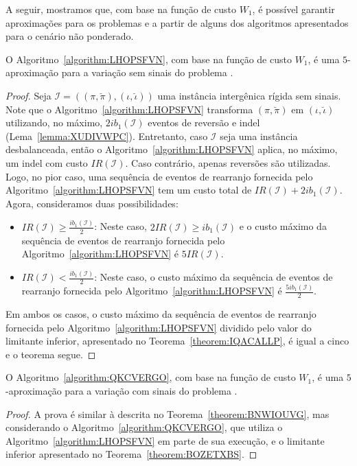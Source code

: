 A seguir, mostramos que, com base na função de custo $W_1$, é possível garantir aproximações para os problemas \SbWIRI{} e \SbWIRTI{} a partir de alguns dos algoritmos apresentados para o cenário não ponderado.

\begin{theorem}\label{theorem:BNWIOUVG}
O Algoritmo~\ref{algorithm:LHOPSFVN}, com base na função de custo $W_1$, é uma $5$-aproximação para a variação sem sinais do problema \SbWIRI{}.
\end{theorem}
\begin{proof}
Seja $\mathcal{I} = ((\pi,\breve\pi),(\iota,\breve\iota))$ uma instância intergênica rígida sem sinais. Note que o Algoritmo~\ref{algorithm:LHOPSFVN} transforma $(\pi,\breve\pi)$ em $(\iota,\breve\iota)$ utilizando, no máximo, $2ib_1(\mathcal{I})$ eventos de reversão e indel (Lema~\ref{lemma:XUDIVWPC}). Entretanto, caso $\mathcal{I}$ seja uma instância desbalanceada, então o Algoritmo~\ref{algorithm:LHOPSFVN} aplica, no máximo, um indel com custo $IR(\mathcal{I})$. Caso contrário, apenas reversões são utilizadas. Logo, no pior caso, uma sequência de eventos de rearranjo fornecida pelo Algoritmo~\ref{algorithm:LHOPSFVN} tem um custo total de $IR(\mathcal{I}) + 2ib_1(\mathcal{I})$. Agora, consideramos duas possibilidades:
\begin{itemize}
  \item $IR(\mathcal{I}) \ge \frac{ib_1(\mathcal{I})}{2}$: Neste caso, $2IR(\mathcal{I}) \ge ib_1(\mathcal{I})$ e o custo máximo da sequência de eventos de rearranjo fornecida pelo Algoritmo~\ref{algorithm:LHOPSFVN} é $5IR(\mathcal{I})$.
  \item $IR(\mathcal{I}) < \frac{ib_1(\mathcal{I})}{2}$: Neste caso, o custo máximo da sequência de eventos de rearranjo fornecida pelo Algoritmo~\ref{algorithm:LHOPSFVN} é $\frac{5ib_1(\mathcal{I})}{2}$.
\end{itemize}
Em ambos os casos, o custo máximo da sequência de eventos de rearranjo fornecida pelo Algoritmo~\ref{algorithm:LHOPSFVN} dividido pelo valor do limitante inferior, apresentado no Teorema~\ref{theorem:IQACALLP}, é igual a cinco e o teorema segue.
\end{proof}

\begin{theorem}\label{theorem:JKFXFCMF}
O Algoritmo~\ref{algorithm:QKCVERGO}, com base na função de custo $W_1$, é uma $5$-aproximação para a variação com sinais do problema \SbWIRI{}.
\end{theorem}
\begin{proof}
A prova é similar à descrita no Teorema~\ref{theorem:BNWIOUVG}, mas considerando o Algoritmo~\ref{algorithm:QKCVERGO}, que utiliza o Algoritmo~\ref{algorithm:LHOPSFVN} em parte de sua execução, e o limitante inferior apresentado no Teorema~\ref{theorem:BOZETXBS}.
\end{proof}

